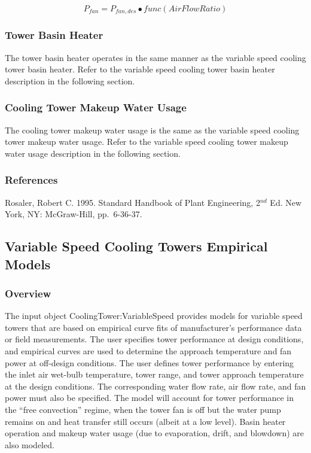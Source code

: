 \begin{equation}
{P_{fan}} = {P_{fan,des}} \bullet func\left( {AirFlowRatio} \right)
\end{equation}

\subsubsection{Tower Basin Heater}\label{tower-basin-heater}

The tower basin heater operates in the same manner as the variable speed cooling tower basin heater. Refer to the variable speed cooling tower basin heater description in the following section.

\subsubsection{Cooling Tower Makeup Water Usage}\label{cooling-tower-makeup-water-usage}

The cooling tower makeup water usage is the same as the variable speed cooling tower makeup water usage. Refer to the variable speed cooling tower makeup water usage description in the following section.

\subsubsection{References}\label{references-015}

Rosaler, Robert C. 1995. Standard Handbook of Plant Engineering, 2\(^{nd}\) Ed. New York, NY: McGraw-Hill, pp.~6-36-37.

\subsection{Variable Speed Cooling Towers Empirical Models}\label{variable-speed-cooling-towers-empirical-models}

\subsubsection{Overview}\label{overview-1-005}

The input object CoolingTower:VariableSpeed provides models for variable speed towers that are based on empirical curve fits of manufacturer's performance data or field measurements. The user specifies tower performance at design conditions, and empirical curves are used to determine the approach temperature and fan power at off-design conditions. The user defines tower performance by entering the inlet air wet-bulb temperature, tower range, and tower approach temperature at the design conditions. The corresponding water flow rate, air flow rate, and fan power must also be specified. The model will account for tower performance in the ``free convection'' regime, when the tower fan is off but the water pump remains on and heat transfer still occurs (albeit at a low level). Basin heater operation and makeup water usage (due to evaporation, drift, and blowdown) are also modeled.

